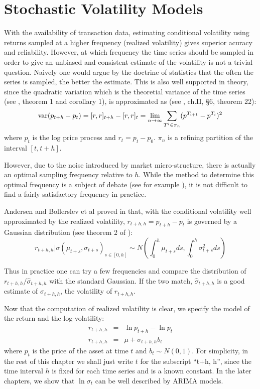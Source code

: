 \documentclass{report}
\begin{document}
\section{Stochastic Volatility Models}\label{sec:SLV_model}
With the availability of transaction data, estimating conditional
volatility using returns sampled at a higher frequency (realized
volatility) gives superior acuracy and reliability. However, at which
frequency the time series should be sampled in order to give an
unbiased and consistent estimate of the volatility is not a trivial
question. Naively one would argue by the doctrine of statistics that
the often the series is sampled, the better the estimate. This is also
well supported in theory, since the quadratic variation which is the
theoretial variance of the time series (see \cite{Andersen03}, theorem
1 and corollary 1), is approximated as (see \cite{Protter05}, ch.II,
\S6, theorem 22):
\[
\text{var}(p_{t+h} - p_t) = [r, r]_{t+h} - [r, r]_t = \lim_{n \to \infty}
\sum_{T^i \in \pi_n} (p^{T_{i+1}} - p^{T_i})^2
\]
where $p_t$ is the log price process and $r_t = p_t - p_0$. $\pi_n$
is a refining partition of the interval $[t, t+h]$.

However, due to the noise introduced by market micro-structure, there
is actually an optimal sampling frequency relative to $h$. While the
method to determine this optimal frequency is a subject of debate (see
for example \cite{Sahalia05}), it is not difficult to find a fairly
satisfactory frequency in practice.

Andersen and Bollerslev et al proved in \cite{Andersen03} that, with
the conditional volatility well approximated by the realized
volatility, $r_{t+h, h} = p_{t+h} - p_t$ is governed by a Gaussian
distribution (see theorem 2 of \cite{Andersen03}):
\[
r_{t+h, h} | \sigma(\mu_{t+s}, \sigma_{t+s})_{s \in [0, h]} \sim
N(\int_{0}^h \mu_{t+s} ds, \int_{0}^h \sigma_{t+s}^2 ds)
\]

Thus in practice one can try a few frequencies and compare the
distribution of $r_{t+h, h}/\hat{\sigma}_{t+h, h}$ with the standard
Gaussian. If the two match, $\hat{\sigma}_{t+h, h}$ is a good estimate
of $\sigma_{t+h, h}$, the volatility of $r_{t+h, h}$.

Now that the computation of realized volatility is clear, we specify
the model of the return and the log-volatility:
\begin{eqnarray}
   r_{t+h, h} &=& \ln p_{t+h} - \ln p_t \nonumber \\
   r_{t+h, h} &=& \mu + \sigma_{t+h, h} b_t \label{eq:SLV_spec}
\end{eqnarray}
where $p_t$ is the price of the asset at time $t$ and $b_t \sim N(0,
1)$. For simplicity, in the rest of this chapter we shall just write
$t$ for the subscript ``t+h, h'', since the time interval $h$ is fixed
for each time series and is a known constant. In the later chapters,
we show that $\ln \sigma_t$ can be well described by ARIMA models.

% 
% 
% 
% 








\end{document}
